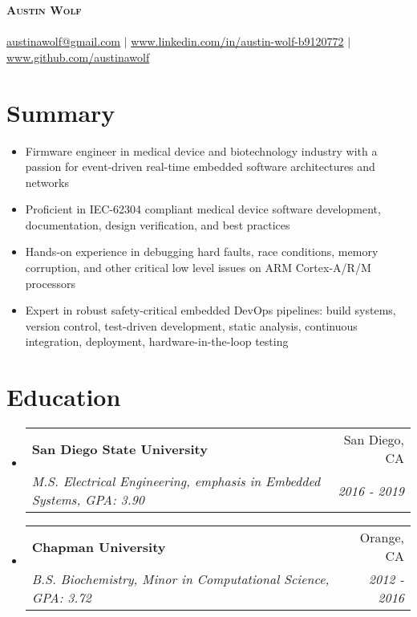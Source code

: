 \documentclass[letterpaper,10pt]{article}
\makeatletter
\newcommand{\summaryItem}[1]{
  \item\small{
    {#1 \vspace{-2pt}}
  }
}
\newcommand{\resumeSubheading}[4]{
  \vspace{-2pt}\item
    \begin{tabular*}{0.97\textwidth}[t]{l@{\extracolsep{\fill}}r}
      \textbf{#1} & #2 \\
      \textit{\small#3} & \textit{\small #4} \\
    \end{tabular*}\vspace{-7pt}
}
\newcommand{\resumeSubHeadingListStart}{\begin{itemize}[leftmargin=0.15in, label={}]}
\newcommand{\resumeSubHeadingListEnd}{\end{itemize}}
\makeatother
\begin{document}
\begin{center}
    \textbf{\Huge \scshape Austin Wolf} \\ \vspace{1pt}
    \small \textit{} \\
    \href{mailto:austinawolf@gmail.com}{austinawolf@gmail.com} $|$ 
    \href{https://www.linkedin.com/in/austin-wolf-b9120772/}{www.linkedin.com/in/austin-wolf-b9120772} $|$
    \href{https://github.com/austinawolf}{www.github.com/austinawolf}
\end{center}

\section*{Summary}
\begin{itemize}
    \summaryItem{Firmware engineer in medical device and biotechnology industry with a passion for event-driven real-time embedded software architectures and networks}
    \summaryItem{Proficient in IEC-62304 compliant medical device software development, documentation, design verification, and best practices}
    \summaryItem{Hands-on experience in debugging hard faults, race conditions, memory corruption, and other critical low level issues on ARM Cortex-A/R/M processors }
    \summaryItem{Expert in robust safety-critical embedded DevOps pipelines: build systems, version control, test-driven development, static analysis, continuous integration, deployment, hardware-in-the-loop testing}
  \end{itemize}

\section{Education}
  \resumeSubHeadingListStart
    \resumeSubheading
      {San Diego State University}{San Diego, CA}
      {M.S. Electrical Engineering, emphasis in Embedded Systems, GPA: 3.90 }{2016 - 2019}
    \resumeSubheading
      {Chapman University}{Orange, CA}
      {B.S. Biochemistry, Minor in Computational Science, GPA: 3.72}{2012 - 2016}
  \resumeSubHeadingListEnd

\end{document}
